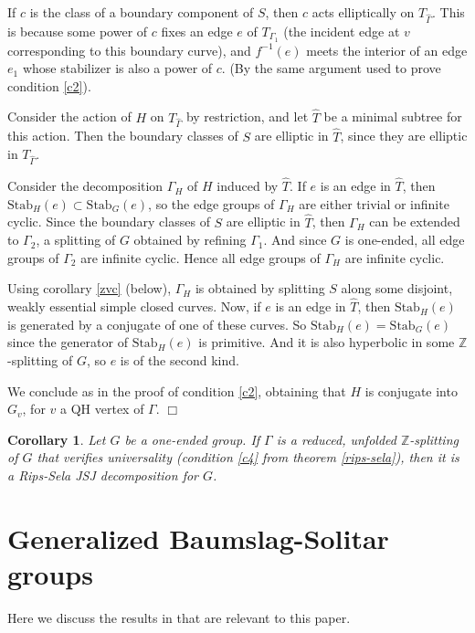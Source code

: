 \documentclass[12pt]{amsart}
\newtheorem{corollary}[theorem]{Corollary}
\newcommand{\Z}{\mathbb{Z}}
\newcommand{\Stab}{\mbox{Stab}}
\begin{document}
If $c$ is the class of a boundary component of $S$, then $c$ acts elliptically on $T_{\hat \Gamma}$. This is because some power of $c$ fixes an edge $e$ of $T_{\Gamma_1}$ (the incident edge at $v$ corresponding to this boundary curve), and $f^{-1}(e)$ meets the interior of an edge $e_1$ whose stabilizer is also a power of $c$. (By the same argument used to prove condition \ref{c2}).

Consider the action of $H$ on $T_{\hat \Gamma}$ by restriction, and let $\hat T$ be a minimal subtree for this action. Then the boundary classes of $S$ are elliptic in $\hat T$, since they are elliptic in $T_{\hat \Gamma}$.

Consider the decomposition $\Gamma_H$ of $H$ induced by $\hat T$. If $e$ is an edge in $\hat T$, then $\Stab_H(e)\subset \Stab_G(e)$, so the edge groups of $\Gamma_H$ are either trivial or infinite cyclic. Since the boundary classes of $S$ are elliptic in $\hat T$, then $\Gamma_H$ can be extended to $\Gamma_2$, a splitting of $G$ obtained by refining $\Gamma_1$. And since $G$ is one-ended, all edge groups of $\Gamma_2$ are infinite cyclic. Hence all edge groups of $\Gamma_H$ are infinite cyclic.

Using corollary \ref{zvc} (below), $\Gamma_H$ is obtained by splitting $S$ along some disjoint, weakly essential simple closed curves. Now, if $e$ is an edge in $\hat T$, then $\Stab_H(e)$ is generated by a conjugate of one of these curves. So $\Stab_H(e)=\Stab_G(e)$ since the generator of $\Stab_H(e)$ is primitive. And it is also hyperbolic in some $\Z$-splitting of $G$, so $e$ is of the second kind.

We conclude as in the proof of condition \ref{c2}, obtaining that $H$ is conjugate into $G_v$, for $v$ a QH vertex of $\Gamma$. $\Box$


\begin{corollary} \label{universality} Let $G$ be a one-ended group. If $\Gamma$ is a reduced, unfolded $\Z$-splitting of $G$ that verifies universality (condition \ref{c4} from theorem \ref{rips-sela}), then it is a Rips-Sela JSJ decomposition for $G$. 
\end{corollary}

\section{Generalized Baumslag-Solitar groups} \label{gbs-section}

Here we discuss the results in \cite{forester} that are relevant to this paper.
\end{document}
